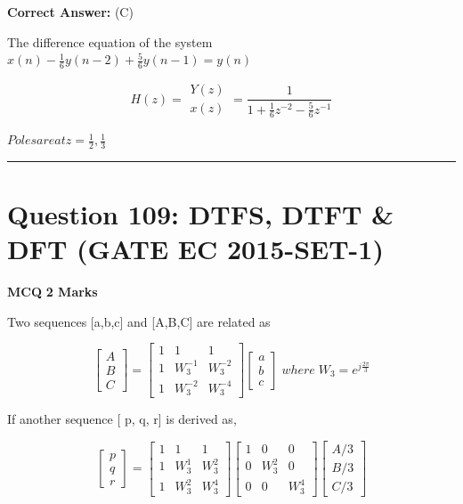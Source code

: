 \documentclass[11pt,a4paper]{article}
\begin{document}
\noindent \textbf{Correct Answer:} (C)

\begin{tcolorbox}[solbox, title=Detailed Solution -- Question 108]
The difference equation of the system
$x(n)-\frac{1}{6} y(n-2)+\frac{5}{6} y(n-1)=y(n)$

\[
H(z)=\begin{array}{l}Y(z) \\ x(z)\end{array}=\frac{1}{1+\frac{1}{6} z^{-2}-\frac{5}{6} z^{-1}}
\]

$Poles are at z=\frac{1}{2}, \frac{1}{3}$
\end{tcolorbox}

\vspace{1.5em}
\hrule
\vspace{1.5em}

\section*{Question 109: DTFS, DTFT \& DFT (GATE EC 2015-SET-1)}
\noindent \textbf{\color{primary}MCQ} \hfill \textbf{\color{secondary}2 Marks}


\noindent Two sequences [a,b,c] and [A,B,C] are related as 
 
\[
\begin{bmatrix} A\\ B\\ C \end{bmatrix}=\begin{bmatrix} 1 & 1& 1\\ 1& W_{3}^{-1} & W_{3}^{-2}\\ 1&W_{3}^{-2} & W_{3}^{-4} \end{bmatrix} \begin{bmatrix} a\\ b\\ c \end{bmatrix} \;  where\;  W_{3}=e^{j\frac{2\pi }{3}}
\]
 
 If another sequence [ p, q, r] is derived as, 
 
\[
\begin{bmatrix} p\\ q\\ r \end{bmatrix}=\begin{bmatrix} 1 & 1& 1\\ 1& W_{3}^{1} & W_{3}^{2}\\ 1&W_{3}^{2} & W_{3}^{4} \end{bmatrix} \begin{bmatrix} 1 & 0 & 0\\ 0 & W_{3}^{2} &0 \\ 0&0 & W_{3}^{4} \end{bmatrix} \begin{bmatrix} A/3\\ B/3\\ C/3\end{bmatrix}
\]
 
\end{document}
